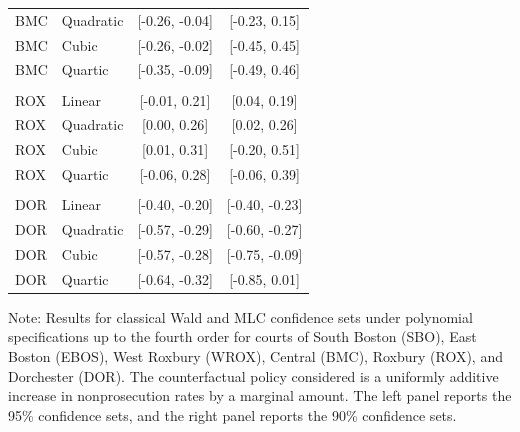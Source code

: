 \documentclass[11pt]{article}
\theoremstyle{definition}
\newcommand{\0}{\ensuremath{\mathbf{0}}}
\begin{document}
\begin{bibunit}
\begin{table}[htbp]
\begin{tabular}{llcc}
    BMC   & Quadratic & [-0.26, -0.04] & [-0.23, 0.15] \\
    BMC   & Cubic & [-0.26, -0.02] & [-0.45, 0.45] \\
    BMC   & Quartic & [-0.35, -0.09] & [-0.49, 0.46] \\
          &       &       &  \\
    ROX   & Linear & [-0.01, 0.21] & [0.04, 0.19] \\
    ROX   & Quadratic & [0.00, 0.26] & [0.02, 0.26] \\
    ROX   & Cubic & [0.01, 0.31] & [-0.20, 0.51] \\
    ROX   & Quartic & [-0.06, 0.28] & [-0.06, 0.39] \\
          &       &       &  \\
    DOR   & Linear & [-0.40, -0.20] & [-0.40, -0.23] \\
    DOR   & Quadratic & [-0.57, -0.29] & [-0.60, -0.27] \\
    DOR   & Cubic & [-0.57, -0.28] & [-0.75, -0.09] \\
    DOR   & Quartic & [-0.64, -0.32] & [-0.85, 0.01] \\
    \bottomrule
    \end{tabular}%
  \label{tab:A-MPRTE}%

    \begin{tablenotes}
    \footnotesize \raggedright
      Note: {Results for classical Wald and MLC confidence sets under polynomial specifications up to the fourth order for courts of South Boston (SBO), East Boston (EBOS), West Roxbury (WROX), Central (BMC), Roxbury (ROX), and Dorchester (DOR). The counterfactual policy considered is a uniformly additive increase in nonprosecution rates by a marginal amount. The left panel reports the 95\% confidence sets, and the right panel reports the 90\% confidence sets.}
    \end{tablenotes}
    
\end{table}%


 
%
%
%


\end{bibunit}
\end{document}
